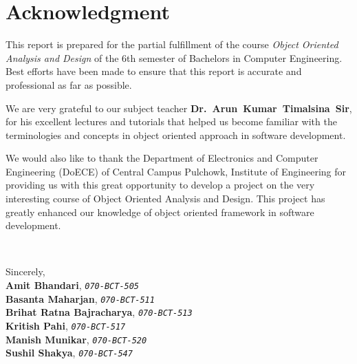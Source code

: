 \section*{Acknowledgment}

This report is prepared for the partial fulfillment of the course {\em Object
Oriented Analysis and Design} of the 6th semester of Bachelors in Computer
Engineering. Best efforts have been made to ensure that this report is
accurate and professional as far as possible.

We are very grateful to our subject teacher {\bf Dr.~Arun~Kumar~Timalsina~Sir}, for his
excellent lectures and tutorials that helped us become familiar with the
terminologies and concepts in object oriented approach in software development.

We would also like to thank the Department of Electronics and Computer
Engineering (DoECE) of Central Campus Pulchowk, Institute of Engineering for
providing us with this great opportunity to develop a project on the very
interesting course of Object Oriented Analysis and Design. This project has
greatly enhanced our knowledge of object oriented framework in software
development.

~

Sincerely,\\
{\bf Amit Bhandari}, {\tt\em 070-BCT-505}\\
{\bf Basanta Maharjan}, {\tt\em 070-BCT-511}\\
{\bf Brihat Ratna Bajracharya}, {\tt\em 070-BCT-513}\\
{\bf Kritish Pahi}, {\tt\em 070-BCT-517}\\
{\bf Manish Munikar}, {\tt\em 070-BCT-520}\\
{\bf Sushil Shakya}, {\tt\em 070-BCT-547}\\
